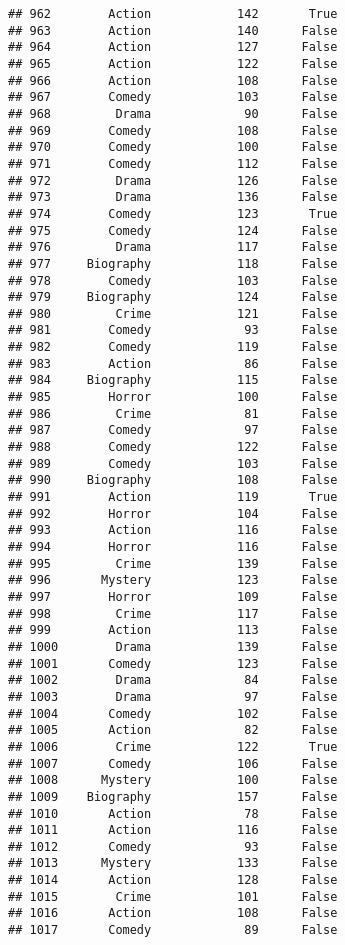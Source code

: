 \documentclass[
]{article}
\begin{document}
\begin{verbatim}
## 962        Action            142       True
## 963        Action            140      False
## 964        Action            127      False
## 965        Action            122      False
## 966        Action            108      False
## 967        Comedy            103      False
## 968         Drama             90      False
## 969        Comedy            108      False
## 970        Comedy            100      False
## 971        Comedy            112      False
## 972         Drama            126      False
## 973         Drama            136      False
## 974        Comedy            123       True
## 975        Comedy            124      False
## 976         Drama            117      False
## 977     Biography            118      False
## 978        Comedy            103      False
## 979     Biography            124      False
## 980         Crime            121      False
## 981        Comedy             93      False
## 982        Comedy            119      False
## 983        Action             86      False
## 984     Biography            115      False
## 985        Horror            100      False
## 986         Crime             81      False
## 987        Comedy             97      False
## 988        Comedy            122      False
## 989        Comedy            103      False
## 990     Biography            108      False
## 991        Action            119       True
## 992        Horror            104      False
## 993        Action            116      False
## 994        Horror            116      False
## 995         Crime            139      False
## 996       Mystery            123      False
## 997        Horror            109      False
## 998         Crime            117      False
## 999        Action            113      False
## 1000        Drama            139      False
## 1001       Comedy            123      False
## 1002        Drama             84      False
## 1003        Drama             97      False
## 1004       Comedy            102      False
## 1005       Action             82      False
## 1006        Crime            122       True
## 1007       Comedy            106      False
## 1008      Mystery            100      False
## 1009    Biography            157      False
## 1010       Action             78      False
## 1011       Action            116      False
## 1012       Comedy             93      False
## 1013      Mystery            133      False
## 1014       Action            128      False
## 1015        Crime            101      False
## 1016       Action            108      False
## 1017       Comedy             89      False

\end{verbatim}
\end{document}
